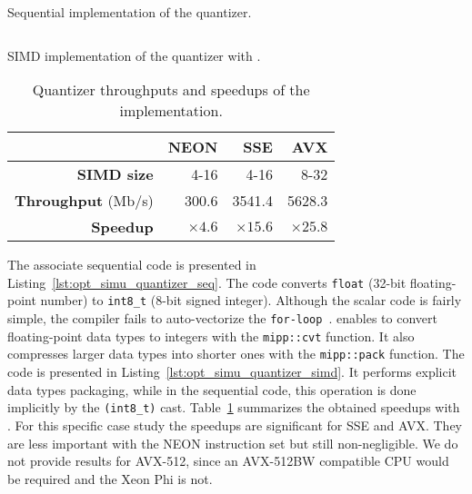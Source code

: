 \begin{listing}[htp]
  \inputminted[frame=lines,linenos]{C++}{\curChapter/src/simu/quantizer/quantizer_seq.cpp}
  \caption{Sequential implementation of the quantizer.}
  \label{lst:opt_simu_quantizer_seq}
\end{listing}

\begin{listing}[htp]
  \inputminted[frame=lines,linenos]{C++}{\curChapter/src/simu/quantizer/quantizer_simd.cpp}
  \caption{SIMD implementation of the quantizer with \MIPP.}
  \label{lst:opt_simu_quantizer_simd}
\end{listing}

\begin{table}[htp]
  \centering
  \caption{Quantizer throughputs and speedups of the \MIPP implementation.}
  \label{tab:opt_simu_quantizer_speedup}
  \begin{tabular}{r | r  r r}
                             & \textbf{NEON} & \textbf{SSE}  & \textbf{AVX}  \\ \hline \hline
  \textbf{SIMD size}         & 4-16          & 4-16          & 8-32          \\
  \textbf{Throughput} (Mb/s) & 300.6         & 3541.4        & 5628.3        \\
  \textbf{Speedup}           & $\times 4.6$  & $\times 15.6$ & $\times 25.8$ \\
  \end{tabular}
\end{table}

The associate sequential code is presented in
Listing~\ref{lst:opt_simu_quantizer_seq}. The code converts \verb|float| (32-bit
floating-point number) to \verb|int8_t| (8-bit signed integer). Although the
scalar code is fairly simple, the compiler fails to auto-vectorize the
\verb|for-loop|~\cite{Cassagne2018}. \MIPP enables to convert floating-point
data types to integers with the \verb|mipp::cvt| function. It also compresses
larger data types into shorter ones with the \verb|mipp::pack| function. The
\MIPP code is presented in Listing~\ref{lst:opt_simu_quantizer_simd}. It
performs explicit data types packaging, while in the sequential code, this
operation is done implicitly by the \verb|(int8_t)| cast.
Table~\ref{tab:opt_simu_quantizer_speedup} summarizes the obtained speedups with
\MIPP. For this specific case study the speedups are significant for SSE and
AVX. They are less important with the NEON instruction set but still
non-negligible. We do not provide results for AVX-512, since an AVX-512BW
compatible CPU would be required and the Xeon Phi is not.

